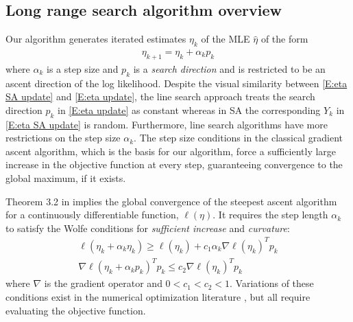 \subsection{Long range search algorithm overview}  

Our algorithm generates iterated estimates $\eta_k$ of the MLE $\hat{\eta}$ of the 
form 
\begin{align} \label{E:eta update}
	\eta_{k+1} = \eta_k + \alpha_k p_k
\end{align}
where $\alpha_k$ is a step size and $p_k$ is a \emph{search direction} and is 
restricted to be an ascent direction of 
the log likelihood.  
Despite the visual similarity between \eqref{E:eta SA update} and \eqref{E:eta 
update}, the line search approach treats 
the search direction $p_k$ in \eqref{E:eta update} as constant whereas in SA the 
corresponding $Y_k$ in \eqref{E:eta SA 
update} is random.
Furthermore, line search algorithms have more restrictions on the step size $\alpha_k$.  
The step size 
conditions in the classical gradient ascent algorithm, which is the basis for our 
algorithm, force  a sufficiently 
large increase in the objective function at every step, guaranteeing convergence to 
the global maximum, if it exists.

Theorem 3.2 in \citep{NW} implies the global convergence of the steepest ascent 
algorithm for a continuously differentiable function, $\ell(\eta)$.  It requires the 
step length $\alpha_k$ to satisfy 
the Wolfe conditions for \emph{sufficient increase} and \emph{curvature}:
\begin{equation} \label{eq:wolfe}
\begin{split}
	\ell(\eta_k + \alpha_k \eta_k) \geq \ell(\eta_k) + c_1 \alpha_k \nabla \ell (\eta_k)^T p_k \\
	\nabla \ell( \eta_k + \alpha_k p_k)^T p_k \leq c_2 \nabla \ell( \eta_k)^T p_k
\end{split}
\end{equation}
where $\nabla$ is the gradient operator and $0 < c_1 < c_2 < 1$.   
Variations of these conditions exist in the numerical optimization literature \citep
{Fletcher,NW,Sun:2006}, but all 
require evaluating the objective function.

